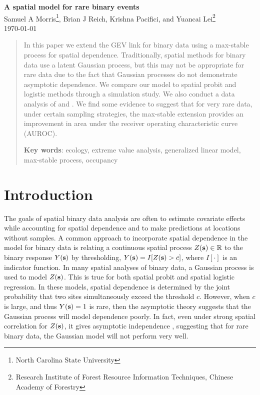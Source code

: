 \documentclass[12pt]{article}
\begin{document}
\linenumbers

\begin{center}
{\Large {\bf A spatial model for rare binary events}}\\
{\large Samuel A Morris\footnote[1]{North Carolina State University}, Brian J Reich\footnotemark[1]{}, Krishna Pacifici\footnotemark[1]{}, and Yuancai Lei\footnote[2]{Research Institute of Forest Resource Information Techniques, Chinese Academy of Forestry}} \\
\today
\end{center}

\begin{abstract}
In this paper we extend the GEV link for binary data using a max-stable process for spatial dependence.
Traditionally, spatial methods for binary data use a latent Gaussian process, but this may not be appropriate for rare data due to the fact that Gaussian processes do not demonstrate asymptotic dependence.
We compare our model to spatial probit and logistic methods through a simulation study.
We also conduct a data analysis of \tamarix{} and \hedysarum{}.
We find some evidence to suggest that for very rare data, under certain sampling strategies, the max-stable extension provides an improvement in area under the receiver operating characteristic curve (AUROC).

{\bf Key words}: ecology, extreme value analysis, generalized linear model, max-stable process, occupancy

\end{abstract}
\newpage


\section{Introduction}\label{rbs:intro}

The goals of spatial binary data analysis are often to estimate covariate effects while accounting for spatial dependence and to make predictions at locations without samples.
A common approach to incorporate spatial dependence in the model for binary data is relating a continuous spatial process $Z(\mathbf{s}) \in \mathbb{R}$ to the binary response $Y(\mathbf{s})$ by thresholding, $Y(\mathbf{s}) = I[Z(\mathbf{s}) > c]$, where $I[\cdot]$ is an indicator function.
In many spatial analyses of binary data, a Gaussian process is used to model $Z(\mathbf{s})$.
This is true for both spatial probit and spatial logistic regression.
In these models, spatial dependence is determined by the joint probability that two sites simultaneously exceed the threshold $c$.
However, when $c$ is large, and thus $Y(\mathbf{s}) = 1$ is rare, then the asymptotic theory suggests that the Gaussian process will model dependence poorly.
In fact, even under strong spatial correlation for $Z(\mathbf{s})$, it gives asymptotic independence \citep{Sibuya1960}, suggesting that for rare binary data, the Gaussian model will not perform very well.
\end{document}

